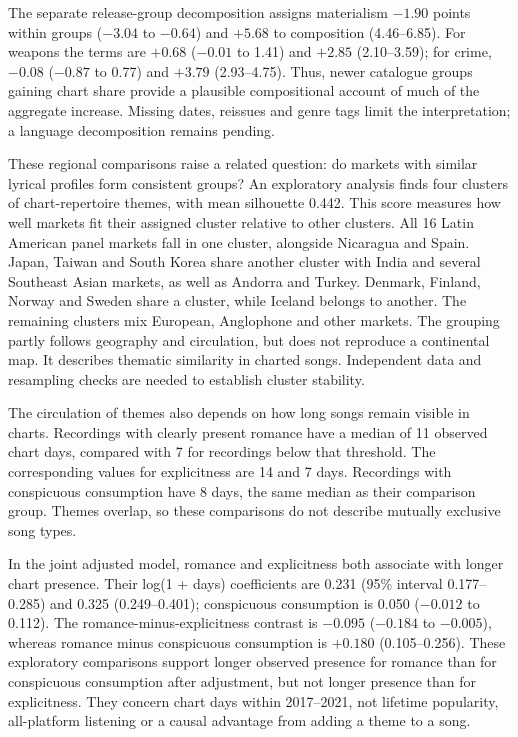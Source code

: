 The separate release-group decomposition assigns materialism $-1.90$ points within groups ($-3.04$ to $-0.64$) and $+5.68$ to composition (4.46--6.85). For weapons the terms are $+0.68$ ($-0.01$ to 1.41) and $+2.85$ (2.10--3.59); for crime, $-0.08$ ($-0.87$ to 0.77) and $+3.79$ (2.93--4.75). Thus, newer catalogue groups gaining chart share provide a plausible compositional account of much of the aggregate increase. Missing dates, reissues and genre tags limit the interpretation; a language decomposition remains pending.

These regional comparisons raise a related question: do markets with similar lyrical profiles form consistent groups? An exploratory analysis finds four clusters of chart-repertoire themes, with mean silhouette 0.442. This score measures how well markets fit their assigned cluster relative to other clusters. All 16 Latin American panel markets fall in one cluster, alongside Nicaragua and Spain. Japan, Taiwan and South Korea share another cluster with India and several Southeast Asian markets, as well as Andorra and Turkey. Denmark, Finland, Norway and Sweden share a cluster, while Iceland belongs to another. The remaining clusters mix European, Anglophone and other markets. The grouping partly follows geography and circulation, but does not reproduce a continental map. It describes thematic similarity in charted songs. Independent data and resampling checks are needed to establish cluster stability.

The circulation of themes also depends on how long songs remain visible in charts. Recordings with clearly present romance have a median of 11 observed chart days, compared with 7 for recordings below that threshold. The corresponding values for explicitness are 14 and 7 days. Recordings with conspicuous consumption have 8 days, the same median as their comparison group. Themes overlap, so these comparisons do not describe mutually exclusive song types.

In the joint adjusted model, romance and explicitness both associate with longer chart presence. Their log(1 + days) coefficients are 0.231 (95\% interval 0.177--0.285) and 0.325 (0.249--0.401); conspicuous consumption is 0.050 ($-0.012$ to 0.112). The romance-minus-explicitness contrast is $-0.095$ ($-0.184$ to $-0.005$), whereas romance minus conspicuous consumption is $+0.180$ (0.105--0.256). These exploratory comparisons support longer observed presence for romance than for conspicuous consumption after adjustment, but not longer presence than for explicitness. They concern chart days within 2017--2021, not lifetime popularity, all-platform listening or a causal advantage from adding a theme to a song.

